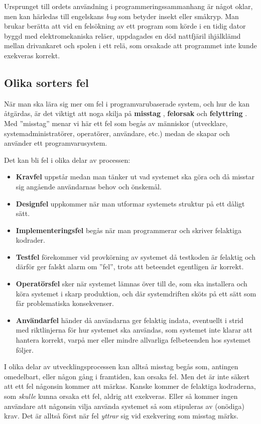 Ursprunget till ordets användning i programmeringssammanhang är något oklar, men kan härledas till engelskans \emph{bug} som betyder insekt eller småkryp. 
Man brukar berätta att vid en felsökning av ett program som körde i en tidig dator byggd med  elektromekaniska reläer, uppdagades en död nattfjäril ihjälklämd mellan drivankaret och spolen i ett relä, som orsakade att programmet inte kunde exekveras korrekt. 



\subsection{Olika sorters fel}

När man ska lära sig mer om fel i programvarubaserade system, och hur de kan åtgärdas, är det viktigt att noga skilja på \textbf{misstag} , \textbf{felorsak}  och \textbf{felyttring} . 
Med ''misstag'' menar vi här ett fel som begås av människor (utvecklare, systemadministratörer, operatörer, användare, etc.) medan de skapar och använder ett programvarusystem. 

Det kan bli fel i olika delar av processen: 
\begin{itemize}
\item \textbf{Kravfel} uppstår medan man tänker ut vad systemet ska göra och då misstar sig angående  användarnas behov och önskemål.
\item \textbf{Designfel} uppkommer när man utformar systemets struktur på ett dåligt sätt.
\item \textbf{Implementeringsfel} begås när man programmerar och skriver felaktiga kodrader. 
\item \textbf{Testfel} förekommer vid provkörning av systemet då testkoden är felaktig och därför ger falskt alarm om ''fel'', trots att beteendet egentligen är korrekt.  
\item \textbf{Operatörsfel} sker när systemet lämnas över till de, som ska installera och köra systemet i skarp produktion, och där systemdriften  sköts på ett sätt som får problematiska konsekvenser.
\item \textbf{Användarfel} händer då användarna ger felaktig indata, eventuellt i strid med riktlinjerna för hur systemet ska användas, som systemet inte klarar att hantera korrekt, varpå mer eller mindre allvarliga felbeteenden hos systemet följer.
\end{itemize} 
I olika delar av utvecklingsprocessen kan alltså misstag begås som, antingen omedelbart, eller någon gång i framtiden, kan orsaka fel. Men det är inte säkert att ett fel någonsin kommer att märkas. Kanske kommer de felaktiga kodraderna, som \emph{skulle} kunna orsaka ett fel, aldrig att exekveras. Eller så kommer ingen användare att någonsin vilja använda systemet så som stipuleras av (onödiga) krav. Det är alltså först när fel \emph{yttrar} sig vid exekvering som misstag märks.

